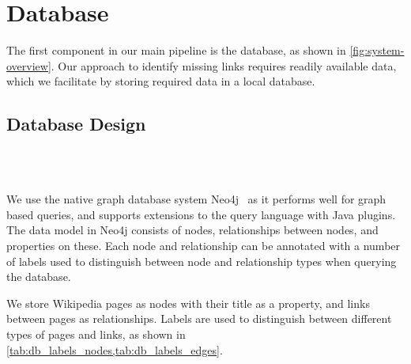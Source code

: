 \section{Database}\label{sec:db}


The first component in our main pipeline is the database, as shown in \cref{fig:system-overview}. Our approach to identify missing links requires readily available data, which we facilitate by storing required data in a local database.

\subsection{Database Design}\label{sec:db_design}

\\
\\

We use the native graph database system Neo4j~\cite{neo4j} as it performs well for graph based queries, and supports extensions to the query language with Java plugins. The data model in Neo4j consists of nodes, relationships between nodes, and properties on these. Each node and relationship can be annotated with a number of labels used to distinguish between node and relationship types when querying the database.

We store Wikipedia pages as nodes with their title as a property, and links between pages as relationships. Labels are used to distinguish between different types of pages and links, as shown in \cref{tab:db_labels_nodes,tab:db_labels_edges}.

